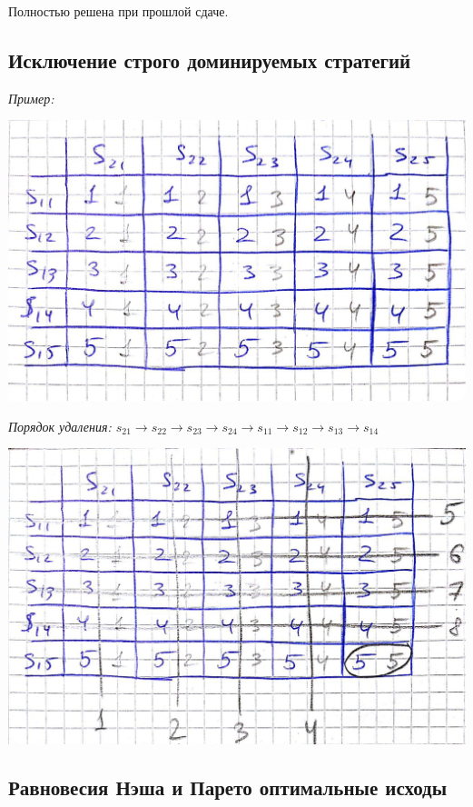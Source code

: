 \documentclass[a4paper,11pt,notitlepage]{article}
\begin{document}
Полностью решена при прошлой сдаче.

\subsection{Исключение строго доминируемых стратегий}

\textit{Пример:}

\includegraphics[scale=0.25]{example-1-6}

\textit{Порядок удаления: $s_{21} \rightarrow s_{22} \rightarrow s_{23} \rightarrow s_{24} \rightarrow s_{11} \rightarrow s_{12} \rightarrow s_{13} \rightarrow s_{14}$} 

\includegraphics[scale=0.25]{example-1-7}

\subsection{Равновесия Нэша и Парето оптимальные исходы}
\end{document}
